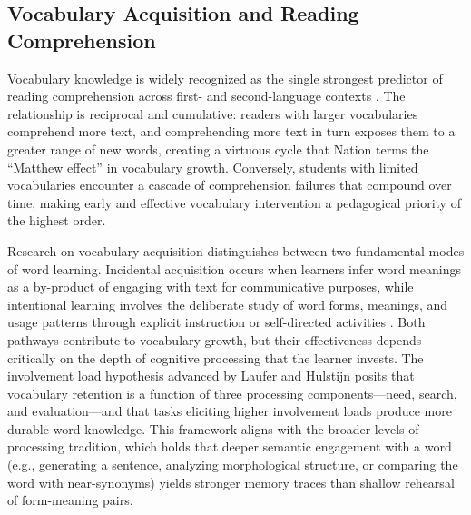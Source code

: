 \subsection{Vocabulary Acquisition and Reading Comprehension}
\label{subsec:vocabulary}

Vocabulary knowledge is widely recognized as the single strongest predictor of reading comprehension across first- and second-language contexts \cite{Nation2013, Stahl2005}. The relationship is reciprocal and cumulative: readers with larger vocabularies comprehend more text, and comprehending more text in turn exposes them to a greater range of new words, creating a virtuous cycle that Nation terms the ``Matthew effect'' in vocabulary growth. Conversely, students with limited vocabularies encounter a cascade of comprehension failures that compound over time, making early and effective vocabulary intervention a pedagogical priority of the highest order.

Research on vocabulary acquisition distinguishes between two fundamental modes of word learning. Incidental acquisition occurs when learners infer word meanings as a by-product of engaging with text for communicative purposes, while intentional learning involves the deliberate study of word forms, meanings, and usage patterns through explicit instruction or self-directed activities \cite{Hulstijn2001}. Both pathways contribute to vocabulary growth, but their effectiveness depends critically on the depth of cognitive processing that the learner invests. The involvement load hypothesis advanced by Laufer and Hulstijn \cite{Laufer2010} posits that vocabulary retention is a function of three processing components---need, search, and evaluation---and that tasks eliciting higher involvement loads produce more durable word knowledge. This framework aligns with the broader levels-of-processing tradition, which holds that deeper semantic engagement with a word (e.g., generating a sentence, analyzing morphological structure, or comparing the word with near-synonyms) yields stronger memory traces than shallow rehearsal of form-meaning pairs.

